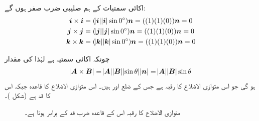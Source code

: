 اکائی سمتیات کے ہم صلیبی ضرب صفر ہوں گے:
\begin{align*}
{\ensuremath{{\boldsymbol{{\boldsymbol{i}}}}}}\times{\ensuremath{{\boldsymbol{i}}}}&=(\abs{{\boldsymbol{i}}}\abs{{\boldsymbol{i}}}\sin0^{\circ}){{\boldsymbol{n}}}=((1)(1)(0)){{\boldsymbol{n}}}=0\\
{{\boldsymbol{{\boldsymbol{j}}}}}\times{\ensuremath{{\boldsymbol{{\boldsymbol{j}}}}}}&=(\abs{{\boldsymbol{j}}}\abs{{\boldsymbol{j}}}\sin0^{\circ}){{\boldsymbol{n}}}=((1)(1)(0)){{\boldsymbol{n}}}=0\\
{{\boldsymbol{{\boldsymbol{k}}}}}\times{\ensuremath{{\boldsymbol{{\boldsymbol{k}}}}}}&=(\abs{{\boldsymbol{k}}}\abs{{\boldsymbol{k}}}\sin0^{\circ}){{\boldsymbol{n}}}=((1)(1)(0)){{\boldsymbol{n}}}=0
\end{align*}

چونکہ  اکائی سمتیہ ہے لہٰذا  کی مقدار
\begin{align}\label{مساوات_سمتیہ_صلیبی_ضرب_کی_مقدار}
\abs{{{\boldsymbol{A}}}\times{\ensuremath{{\boldsymbol{B}}}}}=\abs{{{\boldsymbol{A}}}}\abs{{{\boldsymbol{B}}}}\abs{\sin\theta}\abs{{{\boldsymbol{n}}}}=\abs{{{\boldsymbol{A}}}}\abs{{{\boldsymbol{B}}}}\sin\theta
\end{align}
ہو گی جو اس متوازی الاضلاع کا رقبہ ہے جس کے ضلع  اور  ہیں۔ اس متوازی الاضلاع کا قاعدہ  جبکہ اس کا قد  ہے (شکل )۔
\begin{figure}
\centering
{}
\caption{متوازی الاضلاع کا رقبہ اس کے قاعدہ ضرب قد کے برابر ہوتا ہے۔}
\label{شکل_سمتیہ_رقبہ_متوازی_الاضلاع}
\end{figure}

